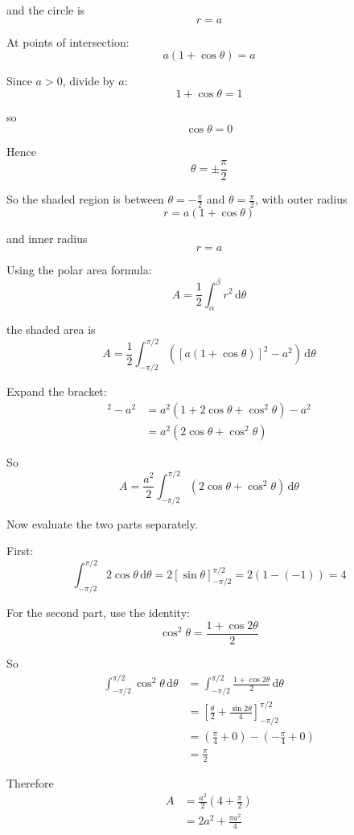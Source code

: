 \documentclass[leqno]{article}
\begin{document}
\begin{enumerate}[
	  label=\textbf{\arabic*.},
	  leftmargin=*,
	  topsep=0pt,
	  partopsep=0pt,
	  parsep=0pt
	]
\begin{djsSolution}
	and the circle is
	\[
	r=a
	\]
	
	At points of intersection:
	\[
	a(1+\cos\theta)=a
	\]

	Since $a>0$, divide by $a$:
	\[
	1+\cos\theta=1
	\]

	so
	\[
	\cos\theta=0
	\]

	Hence
	\[
	\theta=\pm \frac{\pi}{2}
	\]
	
	So the shaded region is between $\theta=-\frac{\pi}{2}$ and $\theta=\frac{\pi}{2}$, with outer radius
	\[
	r=a(1+\cos\theta)
	\]

	and inner radius
	\[
	r=a
	\]
	
	Using the polar area formula:
	\[
	A=\frac12\int_{\alpha}^{\beta} r^2\,\mathrm{d}\theta
	\]

	the shaded area is
	\[
	A=\frac12\int_{-\pi/2}^{\pi/2}\left([a(1+\cos\theta)]^2-a^2\right)\,\mathrm{d}\theta
	\]
	
	Expand the bracket:
	\begin{align*}
	[a(1+\cos\theta)]^2-a^2
	&=a^2(1+2\cos\theta+\cos^2\theta)-a^2 \\
	&=a^2(2\cos\theta+\cos^2\theta)
	\end{align*}
	
	So
	\[
	A=\frac{a^2}{2}\int_{-\pi/2}^{\pi/2}\left(2\cos\theta+\cos^2\theta\right)\,\mathrm{d}\theta
	\]
	
	Now evaluate the two parts separately.
	
	First:
	\[
	\int_{-\pi/2}^{\pi/2} 2\cos\theta\,\mathrm{d}\theta
	=2[\sin\theta]_{-\pi/2}^{\pi/2}
	=2(1-(-1))=4
	\]
	
	For the second part, use the identity:
	\[
	\cos^2\theta=\frac{1+\cos2\theta}{2}
	\]

	So
	\begin{align*}
	\int_{-\pi/2}^{\pi/2}\cos^2\theta\,\mathrm{d}\theta
	&=\int_{-\pi/2}^{\pi/2}\frac{1+\cos2\theta}{2}\,\mathrm{d}\theta \\
	&=\left[\frac{\theta}{2}+\frac{\sin2\theta}{4}\right]_{-\pi/2}^{\pi/2} \\
	&=\left(\frac{\pi}{4}+0\right)-\left(-\frac{\pi}{4}+0\right) \\
	&=\frac{\pi}{2}
	\end{align*}
	
	Therefore
	\begin{align*}
	A
	&=\frac{a^2}{2}\left(4+\frac{\pi}{2}\right) \\
	&=2a^2+\frac{\pi a^2}{4}
	\end{align*}
	

\end{djsSolution}
\end{enumerate}
\end{document}

